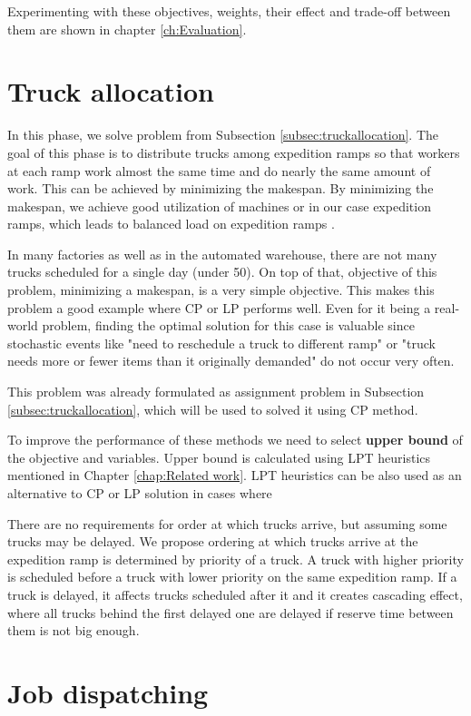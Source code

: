 \documentclass{ctuthesis}
\begin{document}
 Experimenting with these objectives, weights, their effect and trade-off between them are shown in chapter \ref{ch:Evaluation}.


\section{Truck allocation}

In this phase, we solve problem from Subsection \ref{subsec:truckallocation}. The goal of this phase is to distribute trucks among expedition ramps so that workers at each ramp work almost the same time and do nearly the same amount of work. This can be achieved by minimizing the makespan. By minimizing the makespan, we achieve good utilization of machines or in our case expedition ramps, which leads to balanced load on expedition ramps \cite{pinedo}. 

In many factories as well as in the automated warehouse, there are not many trucks scheduled for a single day (under 50). On top of that,  objective of this problem, minimizing a makespan, is a very simple objective. This makes this problem a good example where CP or LP performs well. Even for it being a real-world problem, finding the optimal solution for this case is valuable since stochastic events like "need to reschedule a truck to different ramp" or "truck needs more or fewer items than it originally demanded" do not occur very often.

This problem was already formulated as assignment problem in Subsection \ref{subsec:truckallocation}, which will be used to solved it using CP method.

To improve the performance of these methods we need to select \textbf{upper bound} of the objective and variables. Upper bound is calculated using LPT heuristics mentioned in Chapter \ref{chap:Related work}. LPT heuristics can be also used as an alternative to CP or LP solution in cases where 

There are no requirements for order at which trucks arrive, but assuming some trucks may be delayed. We propose ordering at which trucks arrive at the expedition ramp is determined by priority of a truck. A truck with higher priority is scheduled before a truck with lower priority on the same expedition ramp. If a truck is delayed, it affects trucks scheduled after it and it creates cascading effect, where all trucks behind the first delayed one are delayed if reserve time between them is not big enough. 

\section{Job dispatching}
\end{document}
